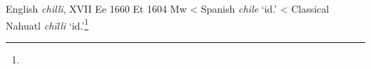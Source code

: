 \begin{etymology}\label{ety:chile}
English \textit{chilli}, XVII Ee 1660 Et 1604 Mw
< Spanish \textit{chile} `id.'
< Classical Nahuatl \textit{chīlli} `id.'\footnote{}
\end{etymology}